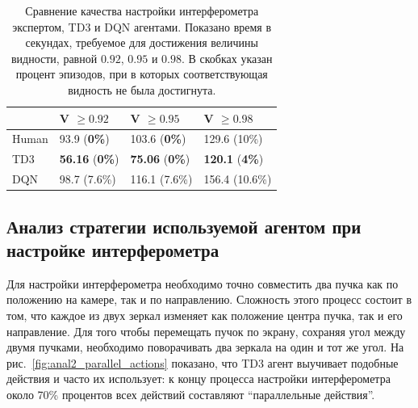 \begin{table} [htbp]
    \centering
    \begin{threeparttable}
        \caption{Сравнение качества настройки интерферометра экспертом, TD3 и DQN агентами. Показано время в секундах, требуемое для достижения величины видности, равной $0.92$, $0.95$ и $0.98$. В скобках указан процент эпизодов, при в которых соответствующая видность не была достигнута.}\label{tab:human}
        \begin{tabular}{| p{4cm} || p{4cm} || p{4cm} || p{4cm} |}
            \hline
            \hline
            &V $\ge 0.92$ & V $\ge 0.95$ & V $\ge 0.98$ \\
            \hline
            Human &  93.9 (\textbf{0\%})  & 103.6 (\textbf{0\%}) & 129.6 (10\%)\\
            TD3 &  \textbf{56.16} (\textbf{0\%}) & \textbf{75.06} (\textbf{0\%}) & \textbf{120.1} (\textbf{4\%})\\
            DQN &  98.7 (7.6\%) & 116.1 (7.6\%) & 156.4 (10.6\%)\\
            \hline
            \hline
        \end{tabular}
    \end{threeparttable}
\end{table}

\subsection{Анализ стратегии используемой агентом при настройке интерферометра}\label{sec:ch2/sec8/subsec2}

Для настройки интерферометра необходимо точно совместить два пучка как по положению на камере, так и по направлению. Сложность этого процесс состоит в том, что каждое из двух зеркал изменяет как положение центра пучка, так и его направление. Для того чтобы перемещать пучок по экрану, сохраняя угол между двумя пучками, необходимо поворачивать два зеркала на один и тот же угол. На рис.~\ref{fig:anal2_parallel_actions} показано, что TD3 агент выучивает подобные действия и часто их использует: к концу процесса настройки интерферометра около 70\% процентов всех действий составляют ``параллельные действия''. 

